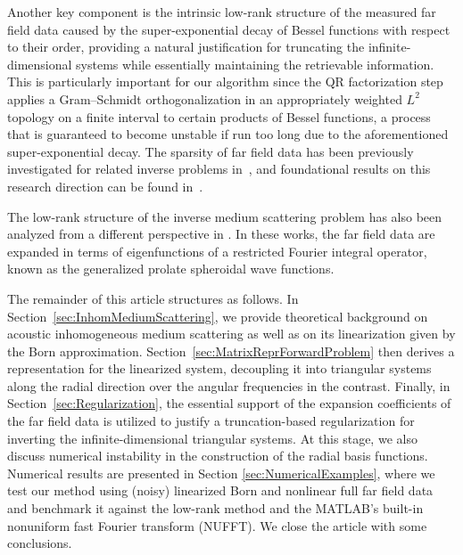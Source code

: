 \documentclass[11pt,a4paper]{article}
\theoremstyle{definition}
\theoremstyle{remark} \newtheorem{remark}[theorem]{Remark}
\numberwithin{equation}{section}
\numberwithin{figure}{section}
\numberwithin{algorithm}{section}
\numberwithin{table}{section}
\begin{document}
Another key component is the intrinsic low-rank structure of the measured far field data caused by the super-exponential decay of Bessel functions with respect to their order, providing a natural justification for truncating the infinite-dimensional systems while essentially maintaining the retrievable information. This is particularly important for our algorithm since the QR factorization step applies a Gram--Schmidt orthogonalization in an appropriately weighted $L^2$ topology on a finite interval to certain products of Bessel functions, a process that is guaranteed to become unstable if run too long due to the aforementioned super-exponential decay.
The sparsity of far field data has been previously investigated for related inverse problems in~\cite{GriSch24,GriSch25}, and foundational results on this research direction can be found in~\cite{GriHanSyl14,GriSyl16,GriSyl17two}.

The low-rank structure of the inverse medium scattering problem has also been analyzed from a different perspective in \cite{Men23,ZhoAudMenZha26}.
In these works, the far field data are expanded in terms of eigenfunctions of a restricted Fourier integral operator, known as the generalized prolate spheroidal wave functions.

The remainder of this article structures as follows.
In Section~\ref{sec:InhomMediumScattering},
we provide theoretical background on acoustic inhomogeneous medium scattering as well as on its linearization given by the Born approximation.
Section~\ref{sec:MatrixReprForwardProblem} then derives a representation for the linearized system, decoupling it into triangular systems along the radial direction over the angular frequencies in the contrast.
Finally, in Section~\ref{sec:Regularization}, the essential support of the expansion coefficients of the far field data is utilized to justify a truncation-based regularization for inverting the infinite-dimensional triangular systems.
At this stage, we also discuss numerical instability in the construction of the radial basis functions.
Numerical results are presented in Section \ref{sec:NumericalExamples}, where we test our method using (noisy) linearized Born and nonlinear full far field data and benchmark it against the low-rank method \cite{ZhoAudMenZha26} and the MATLAB's built-in nonuniform fast Fourier transform (NUFFT). We close the article with some conclusions.
\end{document}
